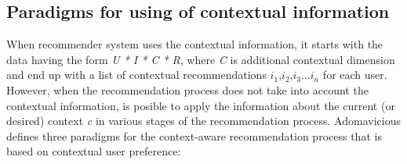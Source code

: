 \subsection{Paradigms for using of contextual information}

When recommender system uses the contextual information, it starts
with the data having the form \textit{U * I * C * R}, where \textit{C}
is additional contextual dimension and end up with a list of
contextual recommendations $i_{1}$,$i_{2}$,$i_{3}$...$i_{n}$ for each
user. However, when the recommendation process does not take into
account  the contextual information, is posible to apply the
information about the current (or desired) context \textit{c} in
various stages of the recommendation process.
Adomavicious\cite{adomavicius2011context} defines three paradigms for
the context-aware recommendation process that is based on contextual
user preference:
